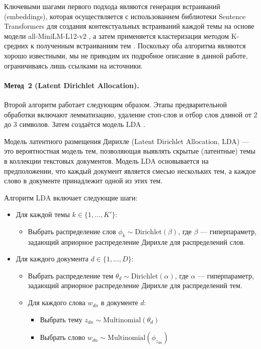\documentclass[14pt,a4paper]{article}
\begin{document}
Ключевыми шагами первого подхода являются генерация встраиваний (embeddings), которая осуществляется с использованием библиотеки Sentence Transformers \cite{Reimers2019} для создания контекстуальных встраиваний каждой темы на основе модели all-MiniLM-L12-v2 \cite{SentenceTransformers}, а затем применяется кластеризация методом K-средних к полученным встраиваниям тем \cite{sinaga2020unsupervised}. Поскольку оба алгоритма являются хорошо известными, мы не приводим их подробное описание в данной работе, ограничиваясь лишь ссылками на источники.


\paragraph{Метод~2 (Latent Dirichlet Allocation).}
Второй алгоритм работает следующим образом. Этапы предварительной обработки включают лемматизацию, удаление стоп-слов и отбор слов длиной от 2 до 3 символов. Затем создаётся модель LDA \cite{blei2003latent}.

Модель латентного размещения Дирихле (Latent Dirichlet Allocation, LDA) — это вероятностная модель тем, позволяющая выявлять скрытые (латентные) темы в коллекции текстовых документов. Модель LDA основывается на предположении, что каждый документ является смесью нескольких тем, а каждое слово в документе принадлежит одной из этих тем.

Алгоритм LDA включает следующие шаги:
\begin{itemize}
\item Для каждой темы $k \in \{1, \ldots, K'\}$:
\begin{itemize}
\item Выбрать распределение слов $\phi_k \sim \mathrm{Dirichlet}(\beta)$, где $\beta$ — гиперпараметр, задающий априорное распределение Дирихле для распределений слов.
\end{itemize}
\item Для каждого документа $d \in \{1, \ldots, D\}$:
\begin{itemize}
\item Выбрать распределение тем $\theta_d \sim \mathrm{Dirichlet}(\alpha)$, где $\alpha$ — гиперпараметр, задающий априорное распределение Дирихле для распределений тем.
\item Для каждого слова $w_{dn}$ в документе $d$:
\begin{itemize}
\item Выбрать тему $z_{dn} \sim \mathrm{Multinomial}(\theta_d)$
\item Выбрать слово $w_{dn} \sim \mathrm{Multinomial}(\phi_{z_{dn}})$
\end{itemize}
\end{itemize}
\end{itemize}
\end{document}
